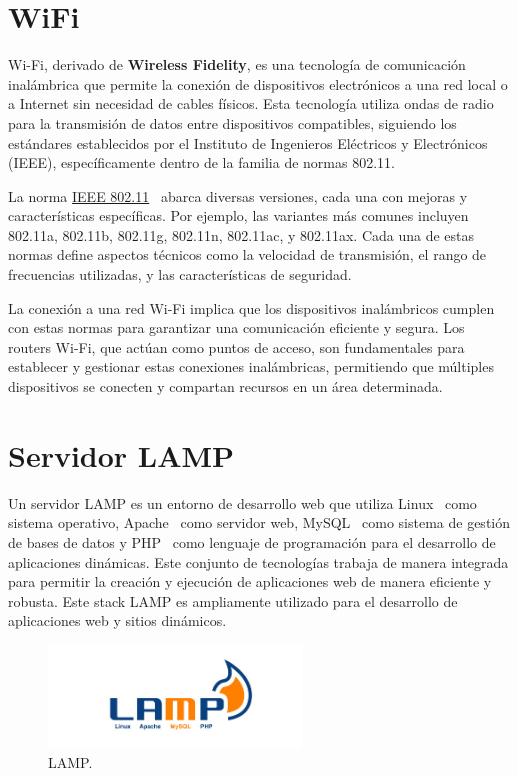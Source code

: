 \section{WiFi}\label{concepto:WIFI}
Wi-Fi, derivado de \textbf{Wireless Fidelity}, es una tecnología de comunicación inalámbrica que permite la conexión de dispositivos electrónicos a una red local o a Internet sin necesidad de cables físicos. Esta tecnología utiliza ondas de radio para la transmisión de datos entre dispositivos compatibles, siguiendo los estándares establecidos por el Instituto de Ingenieros Eléctricos y Electrónicos (IEEE), específicamente dentro de la familia de normas 802.11.

La norma \underline{IEEE 802.11}~\cite{manual:IEEE802.11} abarca diversas versiones, cada una con mejoras y características específicas. Por ejemplo, las variantes más comunes incluyen 802.11a, 802.11b, 802.11g, 802.11n, 802.11ac, y 802.11ax. Cada una de estas normas define aspectos técnicos como la velocidad de transmisión, el rango de frecuencias utilizadas, y las características de seguridad.

La conexión a una red Wi-Fi implica que los dispositivos inalámbricos cumplen con estas normas para garantizar una comunicación eficiente y segura. Los routers Wi-Fi, que actúan como puntos de acceso, son fundamentales para establecer y gestionar estas conexiones inalámbricas, permitiendo que múltiples dispositivos se conecten y compartan recursos en un área determinada.

\section{Servidor LAMP}\label{concepto:LAMP}
Un servidor LAMP es un entorno de desarrollo web que utiliza Linux~\cite{misc:Linux} como sistema operativo, Apache~\cite{misc:Apache} como servidor web, MySQL~\cite{misc:Mysql} como sistema de gestión de bases de datos y PHP~\cite{misc:PHP} como lenguaje de programación para el desarrollo de aplicaciones dinámicas. Este conjunto de tecnologías trabaja de manera integrada para permitir la creación y ejecución de aplicaciones web de manera eficiente y robusta.
Este stack LAMP es ampliamente utilizado para el desarrollo de aplicaciones web y sitios dinámicos.

\begin{figure}[h]
    \centering
    \includegraphics[width=0.6\textwidth]{img/herramientas/lamp.png}
    \caption{LAMP.}
\end{figure}

